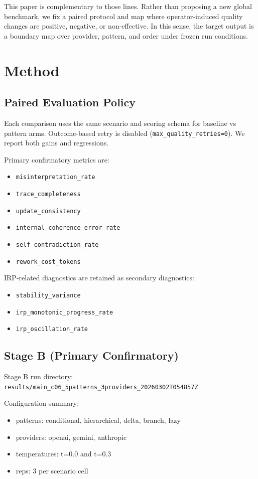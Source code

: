 \documentclass[11pt,a4paper]{article}
\begin{document}
This paper is complementary to those lines. Rather than proposing a new global benchmark, we fix a paired protocol and map where operator-induced quality changes are positive, negative, or non-effective. In this sense, the target output is a boundary map over provider, pattern, and order under frozen run conditions.

\section{Method}
\label{sec:method}

\subsection{Paired Evaluation Policy}

Each comparison uses the same scenario and scoring schema for baseline vs pattern arms. Outcome-based retry is disabled (\texttt{max\_quality\_retries=0}). We report both gains and regressions.

Primary confirmatory metrics are:
\begin{itemize}
  \item \texttt{misinterpretation\_rate}
  \item \texttt{trace\_completeness}
  \item \texttt{update\_consistency}
  \item \texttt{internal\_coherence\_error\_rate}
  \item \texttt{self\_contradiction\_rate}
  \item \texttt{rework\_cost\_tokens}
\end{itemize}

IRP-related diagnostics are retained as secondary diagnostics:
\begin{itemize}
  \item \texttt{stability\_variance}
  \item \texttt{irp\_monotonic\_progress\_rate}
  \item \texttt{irp\_oscillation\_rate}
\end{itemize}

\subsection{Stage B (Primary Confirmatory)}

Stage B run directory:
\texttt{results/main\_c06\_5patterns\_3providers\_20260302T054857Z}

Configuration summary:
\begin{itemize}
  \item patterns: conditional, hierarchical, delta, branch, lazy
  \item providers: openai, gemini, anthropic
  \item temperatures: t=0.0 and t=0.3
  \item reps: 3 per scenario cell
\end{itemize}
\end{document}

